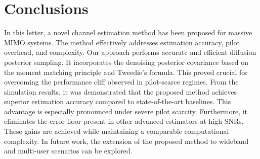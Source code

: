 \documentclass[lettersize,journal]{IEEEtran}
\begin{document}
\section{Conclusions}

In this letter, a novel channel estimation method has been proposed for massive MIMO systems. The method effectively addresses estimation accuracy, pilot overhead, and complexity. Our approach performs accurate and efficient diffusion posterior sampling. It incorporates the denoising posterior covariance based on the moment matching principle and Tweedie's formula. This proved crucial for overcoming the performance cliff observed in pilot-scarce regimes. From the simulation results, it was demonstrated that the proposed method achieves superior estimation accuracy compared to state-of-the-art baselines. This advantage is especially pronounced under severe pilot scarcity. Furthermore, it eliminates the error floor present in other advanced estimators at high SNRs. These gains are achieved while maintaining a comparable computational complexity. In future work, the extension of the proposed method to wideband and multi-user scenarios can be explored.

% 

\end{document}
